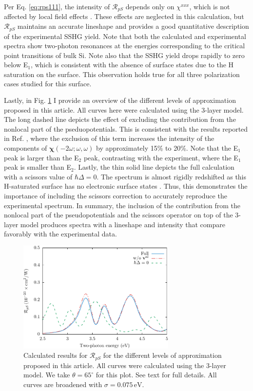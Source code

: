 Per Eq. \eqref{eq:rps111}, the intensity of $\mathcal{R}_{pS}$ depends only on
$\chi^{xxx}$, which is not affected by local field effects
\cite{tancognedejean:tel-01235611}. These effects are neglected in this
calculation, but $\mathcal{R}_{pS}$ maintains an accurate lineshape and provides
a good quantitative description of the experimental SSHG yield. Note that both
the calculated and experimental spectra show two-photon resonances at the
energies corresponding to the critical point transitions of bulk Si. Note also
that the SSHG yield drops rapidly to zero below E$_{1}$, which is consistent
with the absence of surface states due to the H saturation on the surface. This
observation holds true for all three polarization cases studied for this
surface.

Lastly, in Fig. \ref{fig:improvements} I provide an overview of the different
levels of approximation proposed in this article. All curves here were
calculated using the 3-layer model. The long dashed line depicts the effect of
excluding the contribution from the nonlocal part of the pseduopotentials. This
is consistent with the results reported in Ref. \cite{andersonPRB15}, where the
exclusion of this term increases the intensity of the components of
$\boldsymbol{\chi}(-2\omega;\omega,\omega)$ by approximately 15\% to 20\%. Note
that the E$_{1}$ peak is larger than the E$_{2}$ peak, contrasting with the
experiment, where the E$_{1}$ peak is smaller than E$_{2}$. Lastly, the thin
solid line depicts the full calculation with a scissors value of $\hbar\Delta =
0$. The spectrum is almost rigidly redshifted as this H-saturated surface has no
electronic surface states \cite{andersonPRB15}. Thus, this demonstrates the
importance of including the scissors correction to accurately reproduce the
experimental spectrum. In summary, the inclusion of the contribution from the
nonlocal part of the pseudopotentials and the scissors operator on top of the
3-layer model produces spectra with a lineshape and intensity that compare
favorably with the experimental data.

\begin{figure}
\centering
\includegraphics[width=0.7\textwidth]{content/figures/fig-4_4_03}
\caption{Calculated results for $\mathcal{R}_{pS}$ for the different levels of
approximation proposed in this article. All curves were calculated using the
3-layer model. We take $\theta=65^{\circ}$ for this plot. See text for full
details. All curves are broadened with $\sigma=0.075\,\text{eV}$.}
\label{fig:improvements}
\end{figure}



